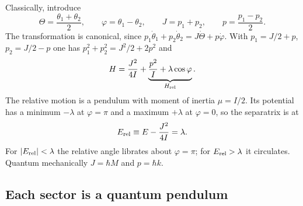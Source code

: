 \documentclass[preprint,12pt]{elsarticle}
\newcommand{\Erel}{E_{\rm rel}}
\begin{document}
Classically, introduce
\begin{equation}
\Theta=\frac{\theta_{1}+\theta_{2}}{2},\qquad
\varphi=\theta_{1}-\theta_{2},\qquad
J=p_{1}+p_{2},\qquad
p=\frac{p_{1}-p_{2}}{2}.
\label{eq:cmrel}
\end{equation}
The transformation is canonical, since
$p_{1}\dot\theta_{1}+p_{2}\dot\theta_{2}=J\dot\Theta+p\dot\varphi$. With
$p_{1}=J/2+p$, $p_{2}=J/2-p$ one has $p_{1}^{2}+p_{2}^{2}=J^{2}/2+2p^{2}$ and
\begin{equation}
H=\frac{J^{2}}{4I}+\underbrace{\frac{p^{2}}{I}+\lambda\cos\varphi}_{H_{\rm rel}} .
\label{eq:Hcm}
\end{equation}
The relative motion is a pendulum with moment of inertia $\mu=I/2$. Its
potential has a minimum $-\lambda$ at $\varphi=\pi$ and a maximum $+\lambda$ at
$\varphi=0$, so the separatrix is at
\begin{equation}
\Erel\equiv E-\frac{J^{2}}{4I}=\lambda .
\label{eq:separatrix}
\end{equation}
For $|\Erel|<\lambda$ the relative angle librates about $\varphi=\pi$; for
$\Erel>\lambda$ it circulates. Quantum mechanically $J=\hbar M$ and $p=\hbar k$.

\subsection{Each sector is a quantum pendulum}
\label{sec:pendulum}
\end{document}
